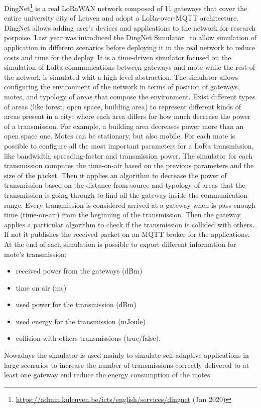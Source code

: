 DingNet\footnote{\href{https://admin.kuleuven.be/icts/english/services/dingnet}{https://admin.kuleuven.be/icts/english/services/dingnet} (Jan 2020)} is a real LoRaWAN network composed of 11 gateways that cover the entire university city of Leuven and adopt a LoRa-over-MQTT architecture. 
% 
DingNet allows adding user's devices and applications to the network for research porpoise.
% 
Last year was introduced the DingNet Simulator~\cite{inproceedings} to allow simulation of application in different scenarios before deploying it in the real network to reduce costs and time for the deploy.
% 
It is a time-driven simulator focused on the simulation of LoRa communications between gateways and mote while the rest of the network is simulated whit a high-level abstraction. 
% 
The simulator allows configuring the environment of the network in terms of position of gateways, motes, and typology of areas that compose the environment. 
% 
Exist different types of areas (like forest, open space, building area) to represent different kinds of areas present in a city; where each area differs for how much decrease the power of a transmission. For example, a building area decreases power more than an open space one.
% 
Motes can be stationary, but also mobile.
% 
For each mote is possible to configure all the most important parameters for a LoRa transmission, like bandwidth, spreading-factor and transmission power. 
% 
The simulator for each transmission computes the time-on-air based on the previous parameters and the size of the packet. 
% 
Then it applies an algorithm to decrease the power of transmission based on the distance from source and typology of areas that the transmission is going through to find all the gateway inside the communication range.
% 
Every transmission is considered arrived at a gateway when is pass enough time (time-on-air) from the beginning of the transmission. 
Then the gateway applies a particular algorithm to check if the transmission is collided with others. If not it publishes the received packet on an MQTT broker for the applications.
%
At the end of each simulation is possible to export different information for mote's transmission:
\begin{itemize}
    \item received power from the gateways (dBm)
    \item time on air (ms)
    \item used power for the transmission (dBm)
    \item used energy for the transmission (mJoule)
    \item collision with others transmissions (true/false).
\end{itemize}

Nowadays the simulator is used mainly to simulate self-adaptive applications in large scenarios to increase the number of transmissions correctly delivered to at least one gateway end reduce the energy consumption of the motes.
